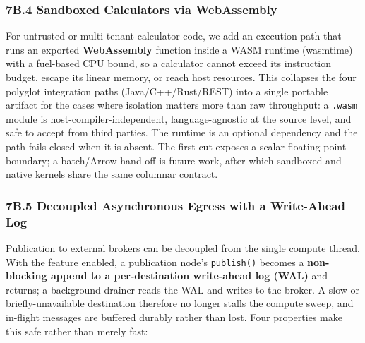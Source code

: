 \documentclass[
]{article}
\begin{document}
\hypertarget{b.4-sandboxed-calculators-via-webassembly}{%
\subsubsection{7B.4 Sandboxed Calculators via
WebAssembly}\label{b.4-sandboxed-calculators-via-webassembly}}

For untrusted or multi-tenant calculator code, we add an execution path
that runs an exported \textbf{WebAssembly} function inside a WASM
runtime (wasmtime) with a fuel-based CPU bound, so a calculator cannot
exceed its instruction budget, escape its linear memory, or reach host
resources. This collapses the four polyglot integration paths
(Java/C++/Rust/REST) into a single portable artifact for the cases where
isolation matters more than raw throughput: a \texttt{.wasm} module is
host-compiler-independent, language-agnostic at the source level, and
safe to accept from third parties. The runtime is an optional dependency
and the path fails closed when it is absent. The first cut exposes a
scalar floating-point boundary; a batch/Arrow hand-off is future work,
after which sandboxed and native kernels share the same columnar
contract.

\hypertarget{b.5-decoupled-asynchronous-egress-with-a-write-ahead-log}{%
\subsubsection{7B.5 Decoupled Asynchronous Egress with a Write-Ahead
Log}\label{b.5-decoupled-asynchronous-egress-with-a-write-ahead-log}}

Publication to external brokers can be decoupled from the single compute
thread. With the feature enabled, a publication node's
\texttt{publish()} becomes a \textbf{non-blocking append to a
per-destination write-ahead log (WAL)} and returns; a background drainer
reads the WAL and writes to the broker. A slow or briefly-unavailable
destination therefore no longer stalls the compute sweep, and in-flight
messages are buffered durably rather than lost. Four properties make
this safe rather than merely fast:
\end{document}
